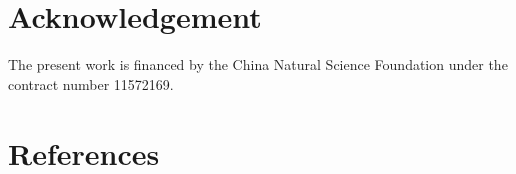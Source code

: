 \documentclass[preprint,5p,twocolumn,11pt,sort&compress]{elsarticle}
\begin{document}

\section*{Acknowledgement}
The present work is financed by the China Natural Science Foundation under the contract number 11572169.

\section*{References}


\end{document}
